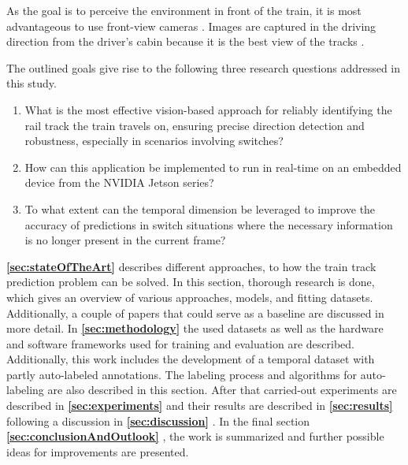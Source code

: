 As the goal is to perceive the environment in front of the train, it is most advantageous to use front-view cameras \cite{tepNet2024} \cite{railNet2019}.
Images are captured in the driving direction from the driver's cabin because it is the best view of the tracks \cite{tepNet2024}.

\vspace{1cm} %

The outlined goals give rise to the following three research questions addressed in this study.

\begin{enumerate}
    \item What is the most effective vision-based approach for reliably identifying the rail track the train travels on, ensuring precise direction detection and robustness, especially in scenarios involving switches?
    \item How can this application be implemented to run in real-time on an embedded device from the NVIDIA Jetson series?
    \item To what extent can the temporal dimension be leveraged to improve the accuracy of predictions in switch situations where the necessary information is no longer present in the current frame?
\end{enumerate}

\vspace{2cm} %

\noindent\textbf{\ref{sec:stateOfTheArt}} \textbf{} describes different approaches, to how the train track prediction problem can be solved.
In this section, thorough research is done, which gives an overview of various approaches, models, and fitting datasets.
Additionally, a couple of papers that could serve as a baseline are discussed in more detail.
In \textbf{\ref{sec:methodology}} \textbf{} the used datasets as well as the hardware and software frameworks used for training and evaluation are described.
Additionally, this work includes the development of a temporal dataset with partly auto-labeled annotations.
The labeling process and algorithms for auto-labeling are also described in this section.
After that carried-out experiments are described in \textbf{\ref{sec:experiments}} \textbf{} and their results are described in \textbf{\ref{sec:results}} \textbf{} following a discussion in \textbf{\ref{sec:discussion}} \textbf{}.
In the final section \textbf{\ref{sec:conclusionAndOutlook}} \textbf{}, the work is summarized and further possible ideas for improvements are presented.
